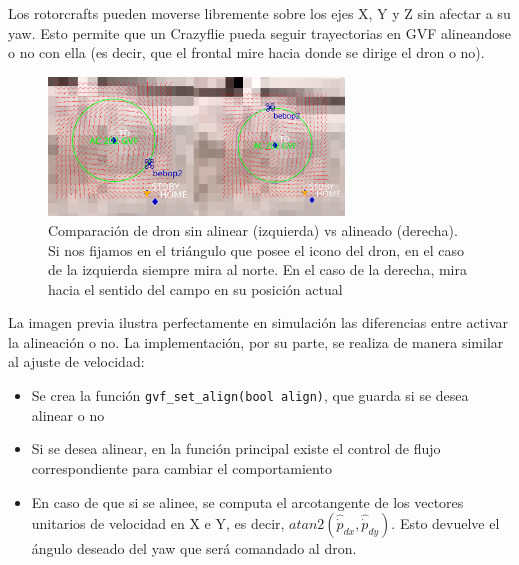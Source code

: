 Los rotorcrafts pueden moverse libremente sobre los ejes X, Y y Z sin afectar a su yaw.
Esto permite que un Crazyflie pueda seguir trayectorias en GVF alineandose o no con ella (es decir, 
que el frontal mire hacia donde se dirige el dron o no).

\begin{figure}[h]
    \centering
    \includegraphics[width=0.7\textwidth]{img/fig/fig3.5-aligned-trajectory-gvf.png}
    \caption{Comparación de dron sin alinear (izquierda) vs alineado (derecha). Si nos fijamos en el triángulo que posee el icono del dron, en el caso de la izquierda siempre mira al norte. En el caso de la derecha, mira hacia el sentido del campo en su posición actual}
    \label{fig:align-with-trajectory}
\end{figure}

La imagen previa ilustra perfectamente en simulación las diferencias entre activar la alineación o no.
La implementación, por su parte, se realiza de manera similar al ajuste de velocidad:

\begin{itemize}
    \item Se crea la función \texttt{gvf\_set\_align(bool align)}, que guarda si se desea alinear o no

    \item Si se desea alinear, en la función principal existe el control de flujo correspondiente para cambiar el comportamiento

    \item En caso de que si se alinee, se computa el arcotangente de los vectores unitarios de velocidad en X e Y, 
    es decir, $atan2(\hat{\dot{p}}_{dx}, \hat{\dot{p}}_{dy})$. 
    Esto devuelve el ángulo deseado del yaw que será comandado al dron.
\end{itemize}